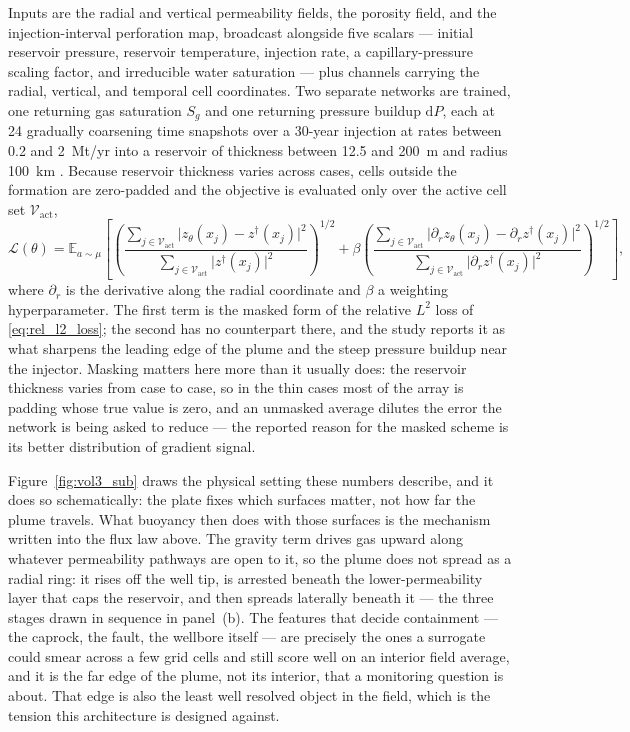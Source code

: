 Inputs are the radial and vertical permeability fields, the porosity field, and the
injection-interval perforation map, broadcast alongside five scalars --- initial
reservoir pressure, reservoir
temperature, injection rate, a capillary-pressure scaling factor, and irreducible
water saturation --- plus channels carrying the radial, vertical, and temporal cell
coordinates. Two separate networks are trained, one returning gas saturation
$S_g$ and one returning pressure buildup $\mathrm{d}P$, each at 24 gradually
coarsening time snapshots over a 30-year injection at rates between 0.2 and
2~Mt/yr into a reservoir of thickness between 12.5 and 200~m and radius 100~km
\cite{wen2022ufno}. Because reservoir thickness varies across cases, cells outside
the formation are zero-padded and the objective is evaluated only over the active
cell set $\mathcal{V}_{\mathrm{act}}$,
\begin{equation}
  \mathcal{L}(\theta) = \mathbb{E}_{a \sim \mu}\left[\left(\frac{\sum_{j \in \mathcal{V}_{\mathrm{act}}} \big| z_\theta(x_j) - z^{\dagger}(x_j) \big|^{2}}{\sum_{j \in \mathcal{V}_{\mathrm{act}}} \big| z^{\dagger}(x_j) \big|^{2}}\right)^{1/2} + \beta \left(\frac{\sum_{j \in \mathcal{V}_{\mathrm{act}}} \big| \partial_r z_\theta(x_j) - \partial_r z^{\dagger}(x_j) \big|^{2}}{\sum_{j \in \mathcal{V}_{\mathrm{act}}} \big| \partial_r z^{\dagger}(x_j) \big|^{2}}\right)^{1/2}\right],
  \label{eq:ch34-loss}
\end{equation}
where $\partial_r$ is the derivative along the radial coordinate and $\beta$ a
weighting hyperparameter. The first term is the masked form of the relative $L^2$
loss of \eqref{eq:rel_l2_loss}; the second has no counterpart there, and the study
reports it as what sharpens the leading edge of the plume and the steep pressure
buildup near the injector. Masking matters here more than it usually does: the
reservoir thickness varies from case to case, so in the thin cases most of the array
is padding whose true value is zero, and an unmasked average dilutes the error the
network is being asked to reduce --- the reported reason for the masked scheme is
its better distribution of gradient signal.

Figure~\ref{fig:vol3_sub} draws the physical setting these numbers describe, and it does so
schematically: the plate fixes which surfaces matter, not how far the plume travels. What
buoyancy then does with those surfaces is the mechanism written into the flux law above. The
gravity term drives gas upward along whatever permeability pathways are open to it, so the
plume does not spread as a radial ring: it rises off the well tip, is arrested beneath the
lower-permeability layer that caps the reservoir, and then spreads laterally beneath it ---
the three stages drawn in sequence in panel~(b). The
features that decide containment --- the caprock, the fault, the wellbore itself --- are
precisely the ones a surrogate could smear across a few grid cells and still score well on an
interior field average, and it is the far edge of the plume, not its interior, that a
monitoring question is about. That edge is also the least well resolved object in the field,
which is the tension this architecture is designed against.

